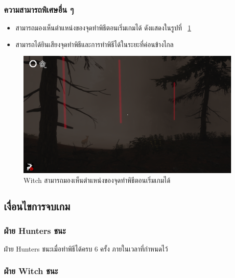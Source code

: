 \subsubsection{ความสามารถพิเศษอื่น ๆ}

\begin{itemize}
  \item สามารถมองเห็นตำแหน่งของจุดทำพิธีตอนเริ่มเกมได้ ดังแสดงในรูปที่ ~\ref{fig:see_ritual}
  \item สามารถได้ยินเสียงจุดทำพิธีและการทำพิธีได้ในระยะที่ค่อนข้างไกล
\end{itemize}

\begin{figure}[h]
  \begin{center}
  \includegraphics[width=\textwidth]{./img/mechanics/see_ritual.png}
  \end{center}
  \caption[Witch สามารถมองเห็นตำแหน่งของจุดทำพิธีตอนเริ่มเกมได้]{Witch สามารถมองเห็นตำแหน่งของจุดทำพิธีตอนเริ่มเกมได้}
  \label{fig:see_ritual}
\end{figure}

\subsection{เงื่อนไขการจบเกม}

\subsubsection{ฝ่าย Hunters ชนะ}

ฝ่าย Hunters ชนะเมื่อทำพิธีได้ครบ 6 ครั้ง ภายในเวลาที่กำหนดไว้

\subsubsection{ฝ่าย Witch ชนะ} 

